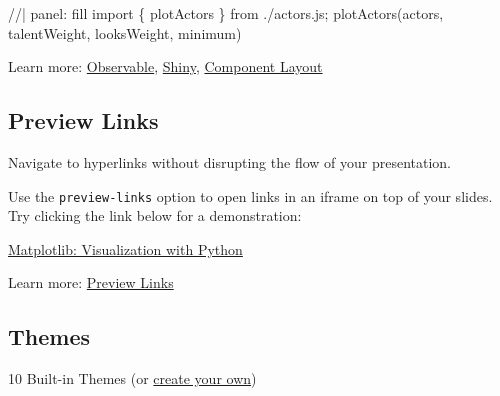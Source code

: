 \documentclass[
  letterpaper,
  DIV=11,
  numbers=noendperiod]{scrartcl}
\newenvironment{Shaded}{\begin{snugshade}}{\end{snugshade}}
\newcommand{\NormalTok}[1]{\textcolor[rgb]{0.00,0.23,0.31}{#1}}
\begin{document}
\begin{Shaded}
\begin{Highlighting}[]
\NormalTok{//| panel: fill}
\NormalTok{import \{ plotActors \} from \textquotesingle{}./actors.js\textquotesingle{};}
\NormalTok{plotActors(actors, talentWeight, looksWeight, minimum)}
\end{Highlighting}
\end{Shaded}

Learn more: \href{https://quarto.org/docs/interactive/ojs/}{Observable},
\href{https://quarto.org/docs/interactive/shiny/}{Shiny},
\href{https://quarto.org/docs/interactive/layout.html}{Component Layout}

\hypertarget{preview-links}{%
\subsection{Preview Links}\label{preview-links}}

Navigate to hyperlinks without disrupting the flow of your presentation.

Use the \texttt{preview-links} option to open links in an iframe on top
of your slides. Try clicking the link below for a demonstration:

\href{https://matplotlib.org/}{Matplotlib: Visualization with Python}

Learn more:
\href{https://quarto.org/docs/presentations/revealjs/presenting.html\#preview-links}{Preview
Links}

\hypertarget{themes}{%
\subsection{Themes}\label{themes}}

10 Built-in Themes (or
\href{https://quarto.org/docs/presentations/revealjs/themes.html\#creating-themes}{create
your own})
\end{document}
